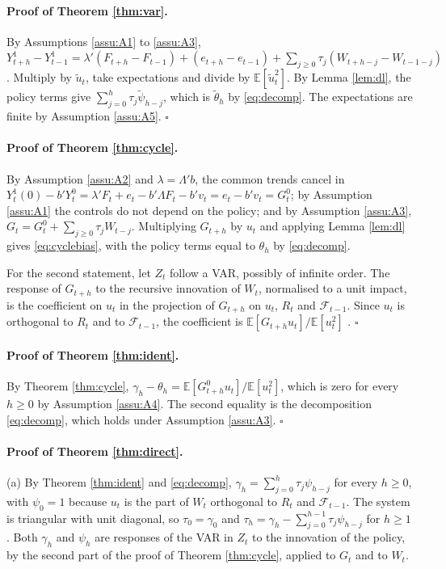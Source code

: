 \documentclass[12pt,a4paper]{article}
\theoremstyle{definition}
\theoremstyle{definition}\newtheorem{example}{Example}
\theoremstyle{definition}\newtheorem{definition}{Definition}
\newcommand{\E}{\mathbb{E}}
\begin{document}
\paragraph{Proof of Theorem \ref{thm:var}.} By Assumptions \ref{assu:A1} to \ref{assu:A3}, $Y^1_{t+h}-Y^1_{t-1}=\lambda'(F_{t+h}-F_{t-1})+(e_{t+h}-e_{t-1})+\sum_{j\geq0}\tau_j(W_{t+h-j}-W_{t-1-j})$. Multiply by $\tilde u_t$, take expectations and divide by $\E[\tilde u_t^2]$. By Lemma \ref{lem:dl}, the policy terms give $\sum_{j=0}^h\tau_j\tilde\psi_{h-j}$, which is $\tilde\theta_h$ by \eqref{eq:decomp}. The expectations are finite by Assumption \ref{assu:A5}. $\square$

\paragraph{Proof of Theorem \ref{thm:cycle}.} By Assumption \ref{assu:A2} and $\lambda=\Lambda'b$, the common trends cancel in $Y^1_t(0)-b'Y^0_t=\lambda'F_t+e_t-b'\Lambda F_t-b'v_t=e_t-b'v_t=G^0_t$; by Assumption \ref{assu:A1} the controls do not depend on the policy; and by Assumption \ref{assu:A3}, $G_t=G^0_t+\sum_{j\geq0}\tau_jW_{t-j}$. Multiplying $G_{t+h}$ by $u_t$ and applying Lemma \ref{lem:dl} gives \eqref{eq:cyclebias}, with the policy terms equal to $\theta_h$ by \eqref{eq:decomp}.

For the second statement, let $Z_t$ follow a VAR, possibly of infinite order. The response of $G_{t+h}$ to the recursive innovation of $W_t$, normalised to a unit impact, is the coefficient on $u_t$ in the projection of $G_{t+h}$ on $u_t$, $R_t$ and $\mathcal F_{t-1}$. Since $u_t$ is orthogonal to $R_t$ and to $\mathcal F_{t-1}$, the coefficient is $\E[G_{t+h}u_t]/\E[u_t^2]$ \citep[Proposition 1]{PlagborgMollerWolf2021}. $\square$

\paragraph{Proof of Theorem \ref{thm:ident}.} By Theorem \ref{thm:cycle}, $\gamma_h-\theta_h=\E[G^0_{t+h}u_t]/\E[u_t^2]$, which is zero for every $h\geq0$ by Assumption \ref{assu:A4}. The second equality is the decomposition \eqref{eq:decomp}, which holds under Assumption \ref{assu:A3}. $\square$

\paragraph{Proof of Theorem \ref{thm:direct}.} (a) By Theorem \ref{thm:ident} and \eqref{eq:decomp}, $\gamma_h=\sum_{j=0}^h\tau_j\psi_{h-j}$ for every $h\geq0$, with $\psi_0=1$ because $u_t$ is the part of $W_t$ orthogonal to $R_t$ and $\mathcal F_{t-1}$. The system is triangular with unit diagonal, so $\tau_0=\gamma_0$ and $\tau_h=\gamma_h-\sum_{j=0}^{h-1}\tau_j\psi_{h-j}$ for $h\geq1$. Both $\gamma_h$ and $\psi_h$ are responses of the VAR in $Z_t$ to the innovation of the policy, by the second part of the proof of Theorem \ref{thm:cycle}, applied to $G_t$ and to $W_t$.
\end{document}
